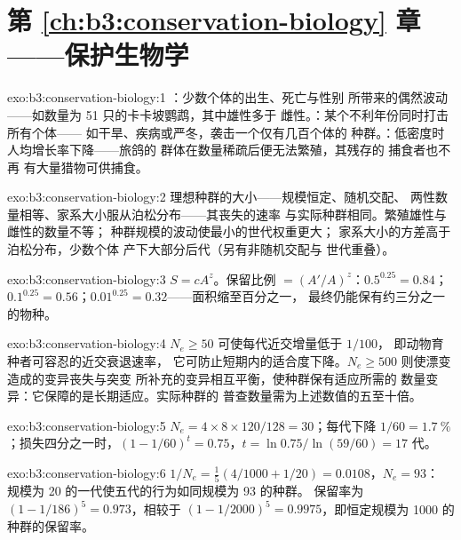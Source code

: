 \section*{第 \ref{ch:b3:conservation-biology} 章——保护生物学}

\begin{solution}{exo:b3:conservation-biology:1}
：少数个体的出生、死亡与性别
所带来的偶然波动——如数量为 51 只的卡卡坡鹦鹉，其中雄性多于
雌性。：某个不利年份同时打击所有个体——
如干旱、疾病或严冬，袭击一个仅有几百个体的
种群。：低密度时人均增长率下降——旅鸽的
群体在数量稀疏后便无法繁殖，其残存的
捕食者也不再
有大量猎物可供捕食。
\end{solution}

\begin{solution}{exo:b3:conservation-biology:2}
理想种群的大小——规模恒定、随机交配、
两性数量相等、家系大小服从泊松分布——其丧失的速率
与实际种群相同。繁殖雄性与雌性的数量不等；
种群规模的波动使最小的世代权重更大；
家系大小的方差高于泊松分布，少数个体
产下大部分后代（另有非随机交配与
世代重叠）。
\end{solution}

\begin{solution}{exo:b3:conservation-biology:3}
$S = cA^{z}$。保留比例 $= (A'/A)^{z}$：$0.5^{0.25} = 0.84$；
$0.1^{0.25} = 0.56$；$0.01^{0.25} = 0.32$——面积缩至百分之一，
最终仍能保有约三分之一的物种。
\end{solution}

\begin{solution}{exo:b3:conservation-biology:4}
$N_{e} \ge 50$ 可使每代近交增量低于 $1/100$，
即动物育种者可容忍的近交衰退速率，
它可防止短期内的适合度下降。$N_{e} \ge
500$ 则使漂变造成的变异丧失与突变
所补充的变异相互平衡，使种群保有适应所需的
数量变异：它保障的是长期适应。实际种群的
普查数量需为上述数值的五至十倍。
\end{solution}

\begin{solution}{exo:b3:conservation-biology:5}
$N_{e} = 4\times 8\times 120/128 = 30$；每代下降 $1/60 =
\qty{1.7}{\%}$；损失四分之一时，$(1 - 1/60)^{t} =
0.75$，$t = \ln 0.75/\ln(59/60) = 17$ 代。
\end{solution}

\begin{solution}{exo:b3:conservation-biology:6}
$1/N_{e} = \tfrac{1}{5}(4/1000 + 1/20) = 0.0108$，$N_{e} = 93$：
规模为 20 的一代使五代的行为如同规模为 93 的种群。
保留率为 $(1 - 1/186)^{5} = 0.973$，相较于 $(1 -
1/2000)^{5} = 0.9975$，即恒定规模为 1000 的种群的保留率。
\end{solution}

